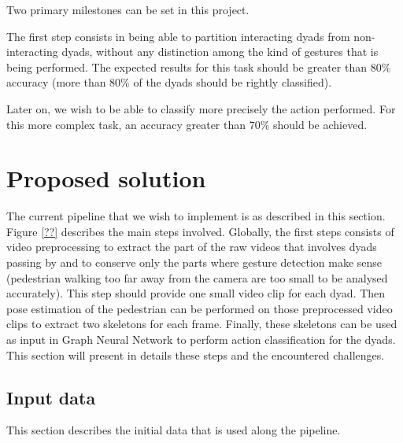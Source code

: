 \documentclass[12pt,a4paper,twoside]{article}
\begin{document}
Two primary milestones can be set in this project.

The first step consists in being able to partition interacting dyads from non-interacting dyads, without any distinction among the kind of gestures that is being performed. The expected results for this task should be greater than 80\% accuracy (more than 80\% of the dyads should be rightly classified).

Later on, we wish to be able to classify more precisely the action performed. For this more complex task, an accuracy greater than 70\% should be achieved. 


\section{Proposed solution}

The current pipeline that we wish to implement is as described in this section. Figure \ref{??} describes the main steps involved. Globally, the first steps consists of video preprocessing to extract the part of the raw videos that involves dyads passing by and to conserve only the parts where gesture detection make sense (pedestrian walking too far away from the camera are too small to be analysed accurately). This step should provide one small video clip for each dyad. Then pose estimation of the pedestrian can be performed on those preprocessed video clips to extract two skeletons for each frame. Finally, these skeletons can be used as input in Graph Neural Network to perform action classification for the dyads. This section will present in details these steps and the encountered challenges.  

\subsection{Input data}
\label{sec:input}

This section describes the initial data that is used along the pipeline. 
\end{document}
